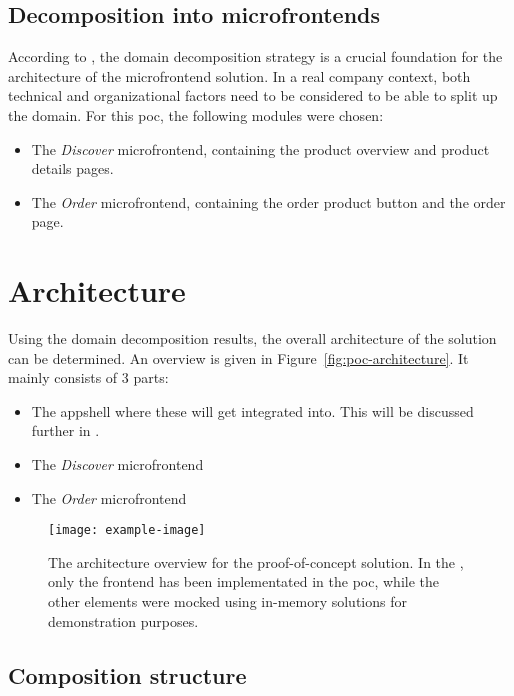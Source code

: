 \subsection{Decomposition into microfrontends}

According to \textcite{Rappl_2021}, the domain decomposition strategy is a
crucial foundation for the architecture of the \gls{microfrontend} solution. In
a real company context, both technical and organizational factors need to be
considered to be able to split up the domain. For this \gls{poc}, the following
modules were chosen:

\begin{itemize}
  \item The \textit{Discover} \gls{microfrontend}, containing the product
  overview and product details pages.
  \item The \textit{Order} \gls{microfrontend}, containing the order product
  button and the order page.
\end{itemize}

\section{Architecture}

Using the domain decomposition results, the overall architecture of the solution
can be determined. An overview is given in Figure~\ref{fig:poc-architecture}. It
mainly consists of 3 parts:
\begin{itemize}
  \item The \gls{appshell} where these 
  will get integrated into. This will be discussed further in
  .
  \item The \textit{Discover} \gls{microfrontend}
  \item The \textit{Order} \gls{microfrontend}
\end{itemize}
 

\begin{figure}
  \centering
  \texttt{[image: example-image]}  %
  \caption[Architecture overview for proof-of-concept solution]{The architecture
  overview for the proof-of-concept solution. In the ,
  only the \gls{frontend} has been implementated in the \gls{poc}, while the
  other elements were mocked using in-memory solutions for demonstration
  purposes.
  }
  \label{fig:poc-diagram}
\end{figure}


\subsection{Composition structure}

